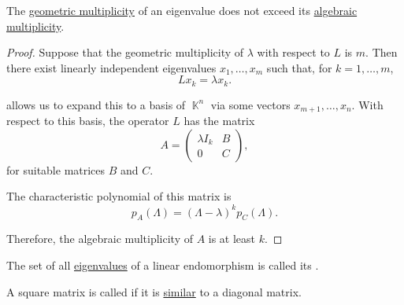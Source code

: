 \begin{proposition}\label{thm:geometric_vs_algebraic_multiplicity}
  The \hyperref[def:characteristic_polynomial]{geometric multiplicity} of an eigenvalue does not exceed its \hyperref[def:characteristic_polynomial]{algebraic multiplicity}.
\end{proposition}
\begin{proof}
  Suppose that the geometric multiplicity of \( \lambda \) with respect to \( L \) is \( m \). Then there exist linearly independent eigenvalues \( x_1, \ldots, x_m \) such that, for \( k = 1, \ldots, m \),
  \begin{equation*}
    L x_k = \lambda x_k.
  \end{equation*}

   allows us to expand this to a basis of \( \BbbK^n \) via some vectors \( x_{m+1}, \ldots, x_n \). With respect to this basis, the operator \( L \) has the matrix
  \begin{equation*}
    A = \begin{pmatrix}
      \lambda I_k & B \\
      0           & C
    \end{pmatrix},
  \end{equation*}
  for suitable matrices \( B \) and \( C \).

  The characteristic polynomial of this matrix is
  \begin{equation*}
    p_A(\Lambda) = (\Lambda - \lambda)^k p_C(\Lambda).
  \end{equation*}

  Therefore, the algebraic multiplicity of \( A \) is at least \( k \).
\end{proof}

\begin{definition}\label{def:point_spectrum}
  The set of all \hyperref[def:eigenpair]{eigenvalues} of a linear endomorphism is called its .
\end{definition}

\begin{definition}\label{def:diagonalizable_matrix}\mimprovised
  A square matrix is called  if it is \hyperref[def:similar_matrices]{similar} to a diagonal matrix.
\end{definition}

